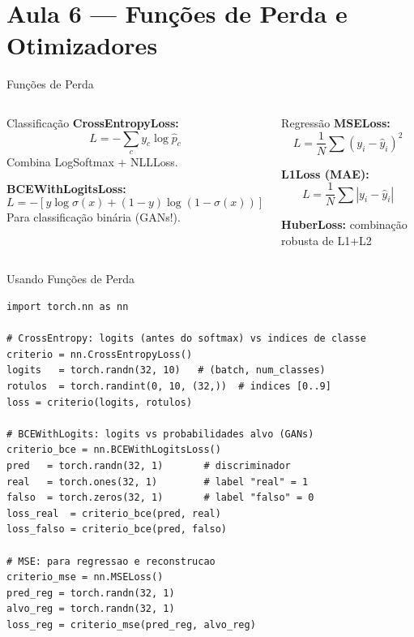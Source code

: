\documentclass[aspectratio=169, 10pt]{beamer}
\begin{document}
\section{Aula 6 — Funções de Perda e Otimizadores}

\begin{frame}{Funções de Perda}
\begin{columns}
\begin{block}{Classificação}
  \textbf{CrossEntropyLoss:}
  \[ L = -\sum_c y_c \log \hat{p}_c \]
  Combina LogSoftmax + NLLLoss.
  
  \vspace{0.3em}
  \textbf{BCEWithLogitsLoss:}
  \[ L = -[y\log\sigma(x) + (1-y)\log(1-\sigma(x))] \]
  Para classificação binária (GANs!).
\end{block}

\begin{block}{Regressão}
  \textbf{MSELoss:}
  \[ L = \frac{1}{N}\sum (y_i - \hat{y}_i)^2 \]
  
  \textbf{L1Loss (MAE):}
  \[ L = \frac{1}{N}\sum |y_i - \hat{y}_i| \]
  
  \textbf{HuberLoss:} combinação robusta de L1+L2
\end{block}
\end{columns}
\end{frame}


\begin{frame}[fragile]{Usando Funções de Perda}
\begin{lstlisting}
import torch.nn as nn

# CrossEntropy: logits (antes do softmax) vs indices de classe
criterio = nn.CrossEntropyLoss()
logits   = torch.randn(32, 10)   # (batch, num_classes)
rotulos  = torch.randint(0, 10, (32,))  # indices [0..9]
loss = criterio(logits, rotulos)

# BCEWithLogits: logits vs probabilidades alvo (GANs)
criterio_bce = nn.BCEWithLogitsLoss()
pred   = torch.randn(32, 1)       # discriminador
real   = torch.ones(32, 1)        # label "real" = 1
falso  = torch.zeros(32, 1)       # label "falso" = 0
loss_real  = criterio_bce(pred, real)
loss_falso = criterio_bce(pred, falso)

# MSE: para regressao e reconstrucao
criterio_mse = nn.MSELoss()
pred_reg = torch.randn(32, 1)
alvo_reg = torch.randn(32, 1)
loss_reg = criterio_mse(pred_reg, alvo_reg)
\end{lstlisting}
\end{frame}
\end{document}
